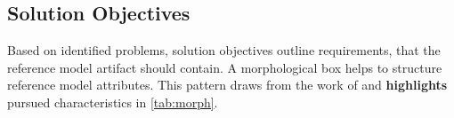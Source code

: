 
\subsection{Solution Objectives}
\label{sec:solobj}


Based on identified problems, solution objectives outline requirements, that the reference model artifact should contain. A morphological box helps to structure reference model attributes. This pattern draws from the work of \cite{Puster2015} and \textbf{highlights} pursued characteristics in \Tab \ref{tab:morph}.  

